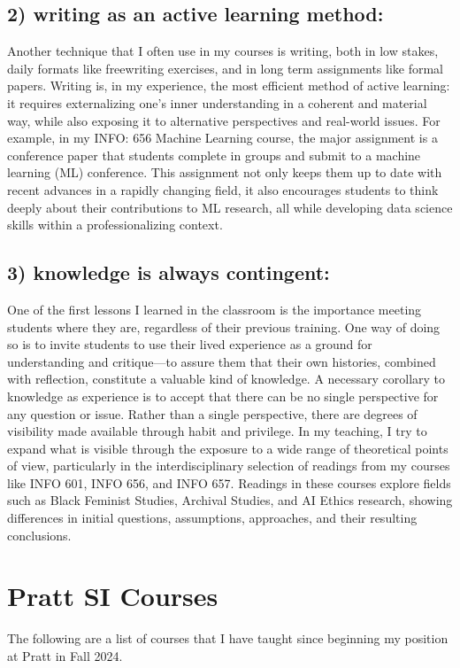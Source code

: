 \documentclass[12pt]{article}
\begin{document}
\subsection*{2) writing as an active learning method:}
\label{sec:orgf48f4e7}
Another technique that I often use in my courses is writing, both in
low stakes, daily formats like freewriting exercises, and in long term
assignments like formal papers. Writing is, in my experience, the most
efficient method of active learning: it requires externalizing one's
inner understanding in a coherent and material way, while also
exposing it to alternative perspectives and real-world issues. For
example, in my INFO: 656 Machine Learning course, the major assignment
is a conference paper that students complete in groups and submit to a
machine learning (ML) conference. This assignment not only keeps them
up to date with recent advances in a rapidly changing field, it also
encourages students to think deeply about their contributions to ML
research, all while developing data science skills within a
professionalizing context.

\subsection*{3) knowledge is always contingent:}
\label{sec:org0348909}
One of the first lessons I learned in the classroom is the importance
meeting students where they are, regardless of their previous
training. One way of doing so is to invite students to use their lived
experience as a ground for understanding and critique---to assure them
that their own histories, combined with reflection, constitute a
valuable kind of knowledge. A necessary corollary to knowledge as
experience is to accept that there can be no single perspective for
any question or issue. Rather than a single perspective, there are
degrees of visibility made available through habit and privilege. In
my teaching, I try to expand what is visible through the exposure to a
wide range of theoretical points of view, particularly in the
interdisciplinary selection of readings from my courses like INFO 601,
INFO 656, and INFO 657. Readings in these courses explore fields such
as Black Feminist Studies, Archival Studies, and AI Ethics research,
showing differences in initial questions, assumptions, approaches, and
their resulting conclusions.

\section*{Pratt SI Courses}
\label{sec:orgfef4664}
The following are a list of courses that I have taught since beginning
my position at Pratt in Fall 2024.
\end{document}
